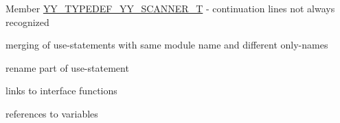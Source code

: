 
\begin{DoxyRefList}
\item[Member \mbox{\hyperlink{fortrancode_8l_a5d5508008cac8fb66fca3baa4e9b6584}{YY\+\_\+\+TYPEDEF\+\_\+\+YY\+\_\+\+SCANNER\+\_\+T}} ]\label{todo__todo000001}%
%
-\/ continuation lines not always recognized
\begin{DoxyItemize}
\item merging of use-\/statements with same module name and different only-\/names
\item rename part of use-\/statement
\item links to interface functions
\item references to variables 
\end{DoxyItemize}
\end{DoxyRefList}